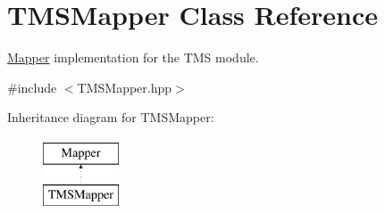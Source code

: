 \hypertarget{classTMSMapper}{
\section{TMSMapper Class Reference}
\label{classTMSMapper}
}


\hyperlink{classMapper}{Mapper} implementation for the TMS module.  




{\ttfamily \#include $<$TMSMapper.hpp$>$}

Inheritance diagram for TMSMapper:\begin{figure}[H]
\begin{center}
\leavevmode
\includegraphics[height=2.000000cm]{classTMSMapper}
\end{center}
\end{figure}
